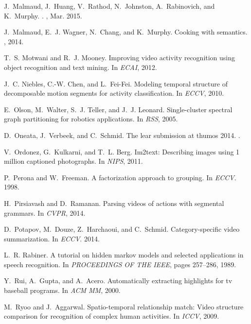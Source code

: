 \documentclass[10pt,twocolumn,letterpaper]{article}
\begin{document}
\begin{thebibliography}{10}
J.~{Malmaud}, J.~{Huang}, V.~{Rathod}, N.~{Johnston}, A.~{Rabinovich}, and
  K.~{Murphy}.
.
, Mar. 2015.

J.~Malmaud, E.~J. Wagner, N.~Chang, and K.~Murphy.
\newblock Cooking with semantics.
, 2014.

T.~S. Motwani and R.~J. Mooney.
\newblock Improving video activity recognition using object recognition and
  text mining.
\newblock In {\em ECAI}, 2012.

J.~C. Niebles, C.-W. Chen, and L.~Fei-Fei.
\newblock Modeling temporal structure of decomposable motion segments for
  activity classification.
\newblock In {\em ECCV}, 2010.

E.~Olson, M.~Walter, S.~J. Teller, and J.~J. Leonard.
\newblock Single-cluster spectral graph partitioning for robotics applications.
\newblock In {\em RSS}, 2005.

D.~Oneata, J.~Verbeek, and C.~Schmid.
\newblock The lear submission at thumos 2014.
.

V.~Ordonez, G.~Kulkarni, and T.~L. Berg.
\newblock Im2text: Describing images using 1 million captioned photographs.
\newblock In {\em NIPS}, 2011.

P.~Perona and W.~Freeman.
\newblock A factorization approach to grouping.
\newblock In {\em ECCV}. 1998.

H.~Pirsiavash and D.~Ramanan.
\newblock Parsing videos of actions with segmental grammars.
\newblock In {\em CVPR}, 2014.

D.~Potapov, M.~Douze, Z.~Harchaoui, and C.~Schmid.
\newblock Category-specific video summarization.
\newblock In {\em ECCV}. 2014.

L.~R. Rabiner.
\newblock A tutorial on hidden markov models and selected applications in
  speech recognition.
\newblock In {\em PROCEEDINGS OF THE IEEE}, pages 257--286, 1989.

Y.~Rui, A.~Gupta, and A.~Acero.
\newblock Automatically extracting highlights for tv baseball programs.
\newblock In {\em ACM MM}, 2000.

M.~Ryoo and J.~Aggarwal.
\newblock Spatio-temporal relationship match: Video structure comparison for
  recognition of complex human activities.
\newblock In {\em ICCV}, 2009.


\end{thebibliography}
\end{document}
